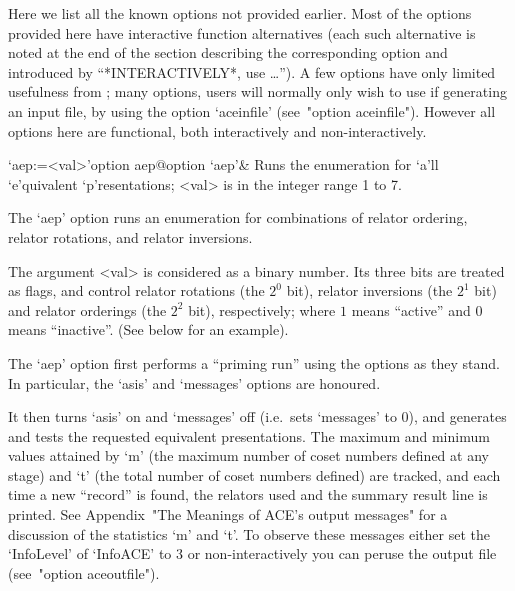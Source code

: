 

Here we list all the known {\ACE} options not provided  earlier.  Most
of the options provided here have  interactive  function  alternatives
(each such alternative is noted at the end of the  section  describing
the corresponding option  and  introduced  by  ``*INTERACTIVELY*,  use
\dots''). A few options have only limited usefulness from {\GAP}; many
options, users will normally only wish to use if generating  an  input
file,  by  using  the  option  `aceinfile'  (see~"option  aceinfile").
However all  options  here  are  functional,  both  interactively  and
non-interactively.


\beginitems

\>`aep:=<val>'{option aep}@{option `aep'}&
Runs the enumeration for `a'll `e'quivalent `p'resentations;
<val> is in the integer range 1 to 7.

The `aep' option runs  an  enumeration  for  combinations  of  relator
ordering, relator rotations, and relator inversions.

The argument <val> is considered as a binary number.  Its  three  bits
are treated as flags, and control relator rotations (the  $2^0$  bit),
relator inversions (the $2^1$ bit) and relator  orderings  (the  $2^2$
bit),  respectively;  where  $1$  means  ``active''  and   $0$   means
``inactive''. (See below for an example).

The `aep' option first performs a ``priming run'' using the options as
they stand. In particular,  the  `asis'  and  `messages'  options  are
honoured.

It then turns `asis' on and `messages' off  (i.e.~sets  `messages'  to
0), and generates and tests the  requested  equivalent  presentations.
The maximum and minimum values attained by `m' (the maximum number  of
coset numbers defined at any stage) and `t' (the total number of coset
numbers defined) are tracked, and each time a new ``record'' is found,
the relators  used  and  the  summary  result  line  is  printed.  See
Appendix~"The Meanings of ACE's output messages" for a  discussion  of
the statistics `m' and `t'. To observe these messages either  set  the
`InfoLevel' of `InfoACE' to 3 or non-interactively you can peruse  the
{\ACE} output file (see~"option aceoutfile").


